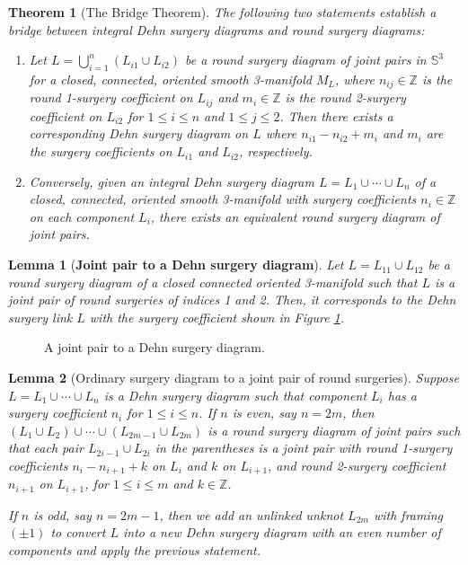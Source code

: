 \documentclass[10pt,a4paper]{amsart}
\newtheorem{thm}{Theorem}
\newtheorem{lem}{Lemma}
\begin{document}
\begin{thm}[The Bridge Theorem]\label{BridgeTheorem}
The following two statements establish a bridge between integral Dehn surgery diagrams and round surgery diagrams:
\begin{enumerate}
    \item[(a)] Let $L=\bigcup_{i=1}^{n} (L_{i1} \cup L_{i2})$ be a round surgery diagram of joint pairs in $\mathbb{S}^3$ for a closed, connected, oriented smooth 3-manifold $M_{L}$, where $n_{ij}\in \mathbb{Z}$ is the round 1-surgery coefficient on $L_{ij}$ and $m_i\in \mathbb{Z}$ is the round 2-surgery coefficient on $L_{i2}$ for $1\leq i\leq n$ and $1 \leq j \leq 2$. Then there exists a corresponding Dehn surgery diagram on $L$ where $n_{i1}-n_{i2}+m_i$ and $m_i$ are the surgery coefficients on $L_{i1}$ and $L_{i2}$, respectively.
    \item[(b)] Conversely, given an integral Dehn surgery diagram $L= L_1 \cup \cdots \cup L_n$ of a closed, connected, oriented smooth 3-manifold with surgery coefficients $n_i \in \mathbb{Z}$ on each component $L_i$, there exists an equivalent round surgery diagram of joint pairs.
\end{enumerate}
\end{thm}

\begin{lem}[{\bf Joint pair to a Dehn surgery diagram}]\label{lem: JPtoOSD}
    Let $L=L_{11} \cup L_{12}$ be a round surgery diagram of a closed connected oriented 3-manifold such that $L$ is a joint pair of round surgeries of indices 1 and 2. Then, it corresponds to the Dehn surgery link $L$ with the surgery coefficient shown in Figure \ref{fig:JPtoOSD}.
\end{lem}

\begin{figure}[ht]
        \centering
        
        \caption{A joint pair to a Dehn surgery diagram.}
        \label{fig:JPtoOSD}
    \end{figure}

\begin{lem}[{Ordinary surgery diagram to a joint pair of round surgeries}]\label{lem: OSDtoJPRS}
Suppose $L=L_1 \cup \cdots \cup L_n$ is a Dehn surgery diagram such that component $L_i$ has a surgery coefficient $n_i$ for $1 \leq i\leq n$. 
If $n$ is even, say $n =2m$, then $(L_1 \cup L_2)\cup  \cdots \cup (L_{2m-1} \cup L_{2m})$ is a round surgery diagram of joint pairs such that each pair $L_{2i-1} \cup L_{2i}$ in the parentheses is a joint pair with round 1-surgery coefficients $n_i -n_{i+1}+k $ on $L_{i}$ and $k$ on $L_{i+1}$, and round 2-surgery coefficient $n_{i+1}$ on $L_{i+1}$, for $1 \leq i \leq m$ and $k\in \mathbb{Z}$. 

If $n$ is odd, say $n=2m-1$, then we add an unlinked unknot $L_{2m}$ with framing $(\pm1)$ to convert $L$ into a new Dehn surgery diagram with an even number of components and apply the previous statement.
\end{lem}
\end{document}
